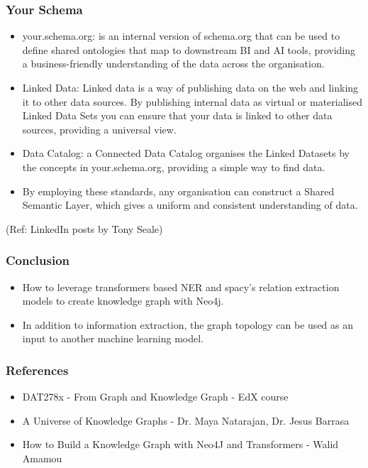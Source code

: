 \begin{frame}[fragile]\frametitle{Your Schema}

\begin{itemize}
\item  your.schema.org: is an internal version of schema.org that can be used to define shared ontologies that map to downstream BI and AI tools, providing a business-friendly understanding of the data across the organisation. 
\item Linked Data: Linked data is a way of publishing data on the web and linking it to other data sources. By publishing internal data as virtual or materialised Linked Data Sets you can ensure that your data is linked to other data sources, providing a universal view. 
\item Data Catalog: a Connected Data Catalog organises the Linked Datasets by the concepts in your.schema.org, providing a simple way to find data. 
\item By employing these standards, any organisation can construct a Shared Semantic Layer, which gives a uniform and consistent understanding of data. 
\end{itemize}
	  
{\tiny (Ref: LinkedIn posts by Tony Seale)}
	  
\end{frame}

\begin{frame}[fragile]\frametitle{Conclusion}

\begin{itemize}
\item How to leverage transformers based NER and spacy’s relation extraction models to create knowledge graph with Neo4j.
\item In addition to information extraction, the graph topology can be used as an input to another machine learning model. 
\end{itemize}
	  
\end{frame}

\begin{frame}[fragile]\frametitle{References}

\begin{itemize}
\item DAT278x - From Graph and Knowledge Graph - EdX course
\item A Universe of Knowledge Graphs -  Dr. Maya Natarajan, Dr. Jesus Barrasa
\item How to Build a Knowledge Graph with Neo4J and Transformers - Walid Amamou
\end{itemize}
	  
\end{frame}

